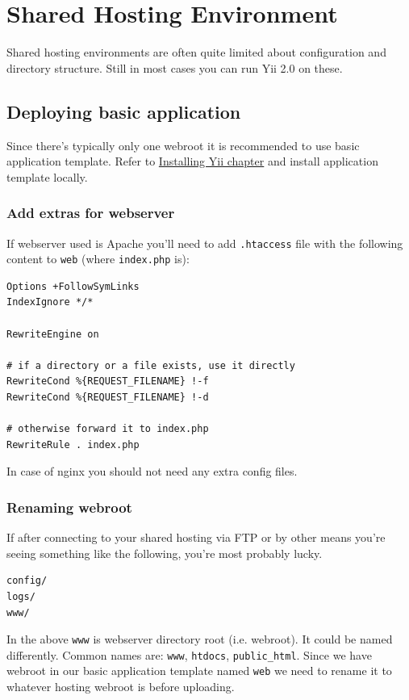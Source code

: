 \label{tutorial-shared-hosting.md}\section{Shared Hosting Environment}
Shared hosting environments are often quite limited about configuration and directory structure. Still in most cases
you can run Yii 2.0 on these.

\subsection{Deploying basic application}
Since there's typically only one webroot it is recommended to use basic application template. Refer to
\hyperref[start-installation.md]{Installing Yii chapter} and install application template locally.

\subsubsection{Add extras for webserver}
If webserver used is Apache you'll need to add \lstinline|.htaccess| file with the following content to \lstinline|web|
(where \lstinline|index.php| is):

\begin{lstlisting}
Options +FollowSymLinks
IndexIgnore */*

RewriteEngine on

# if a directory or a file exists, use it directly
RewriteCond %{REQUEST_FILENAME} !-f
RewriteCond %{REQUEST_FILENAME} !-d

# otherwise forward it to index.php
RewriteRule . index.php
\end{lstlisting}
In case of nginx you should not need any extra config files.

\subsubsection{Renaming webroot}
If after connecting to your shared hosting via FTP or by other means you're seeing something like the following, you're
most probably lucky.

\begin{lstlisting}
config/
logs/
www/
\end{lstlisting}
In the above \lstinline|www| is webserver directory root (i.e. webroot). It could be named differently. Common names are: \lstinline|www|,
\lstinline|htdocs|, \lstinline|public_html|. Since we have webroot in our basic application template named \lstinline|web| we need to rename it to
whatever hosting webroot is before uploading.

